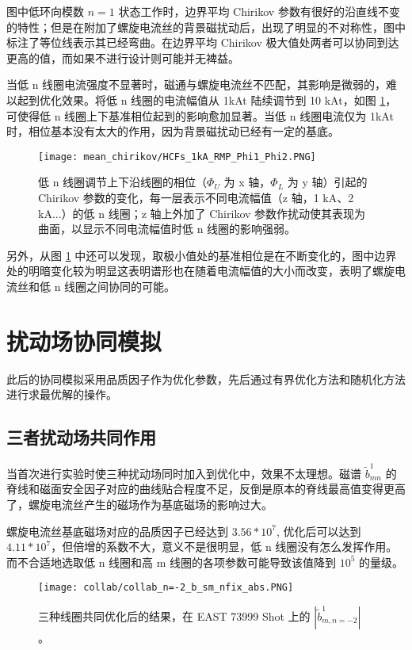 图中低环向模数 $n=1$ 状态工作时，边界平均 Chirikov 参数有很好的沿直线不变的特性；但是在附加了螺旋电流丝的背景磁扰动后，出现了明显的不对称性，图中标注了等位线表示其已经弯曲。在边界平均 Chirikov 极大值处两者可以协同到达更高的值，而如果不进行设计则可能并无裨益。

当低 n 线圈电流强度不显著时，磁通与螺旋电流丝不匹配，其影响是微弱的，难以起到优化效果。将低 n 线圈的电流幅值从 1kAt 陆续调节到 10 kAt，如图 \ref{fig:chirikov-lown-I-layers}，可使得低 n 线圈上下基准相位起到的影响愈加显著。当低 n 线圈电流仅为 1kAt 时，相位基本没有太大的作用，因为背景磁扰动已经有一定的基底。

\begin{figure}[t]
  \centering
    \texttt{[image: mean\_chirikov/HCFs\_1kA\_RMP\_Phi1\_Phi2.PNG]}
  \caption{低 n 线圈调节上下沿线圈的相位（$\Phi_U$ 为 x 轴，$\Phi_L$ 为 y 轴）引起的 Chirikov 参数的变化，每一层表示不同电流幅值（z 轴，1 kA、2 kA...）的低 n 线圈；z 轴上外加了 Chirikov 参数作扰动使其表现为曲面，以显示不同电流幅值时低 n 线圈的影响强弱。}
  \label{fig:chirikov-lown-I-layers}
\end{figure}

另外，从图 \ref{fig:chirikov-lown-I-layers} 中还可以发现，取极小值处的基准相位是在不断变化的，图中边界处的明暗变化较为明显这表明谱形也在随着电流幅值的大小而改变，表明了螺旋电流丝和低 n 线圈之间协同的可能。

\section{扰动场协同模拟}
此后的协同模拟采用品质因子作为优化参数，先后通过有界优化方法和随机化方法进行求最优解的操作。

\subsection{三者扰动场共同作用}
  
  当首次进行实验时使三种扰动场同时加入到优化中，效果不太理想。磁谱 $\tilde{b}^1_{mn}$ 的脊线和磁面安全因子对应的曲线贴合程度不足，反倒是原本的脊线最高值变得更高了，螺旋电流丝产生的磁场作为基底磁场的影响过大。

  螺旋电流丝基底磁场对应的品质因子已经达到 $3.56 * 10^7$, 优化后可以达到 $4.11 * 10^7$，但倍增的系数不大，意义不是很明显，低 n 线圈没有怎么发挥作用。而不合适地选取低 n 线圈和高 m 线圈的各项参数可能导致该值降到 $10^5$ 的量级。 


  \begin{figure}[t]
    \centering
      \texttt{[image: collab/collab\_n=-2\_b\_sm\_nfix\_abs.PNG]}
    \caption{三种线圈共同优化后的结果，在 EAST 73999 Shot 上的 $|\tilde{b}^1_{m,n=-2}|$ 。}
  \end{figure}
  


